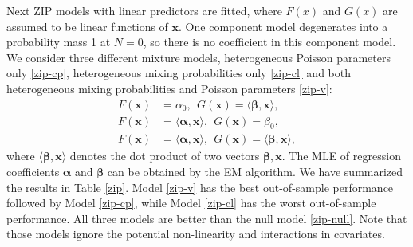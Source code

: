 \documentclass[11pt]{article}
\numberwithin{equation}{section}
\def\bx{\boldsymbol{x}}
\begin{document}
Next ZIP models with linear predictors are fitted, where $F(x)$ and $G(x)$ are assumed to be linear functions of $\bx$.
One component model degenerates into a probability mass 1 at $N=0$, so there is no coefficient in this component model. 
We consider three different mixture models, heterogeneous Poisson parameters only \eqref{zip-cp}, heterogeneous mixing probabilities only \eqref{zip-cl} and both heterogeneous  mixing probabilities and Poisson parameters \eqref{zip-v}:
\begin{align}
	F(\bx)&=\alpha_0, ~~G(\bx)=\langle \boldsymbol{\beta}, \bx\rangle, \label{zip-cp} \\
	F(\bx)&=\langle \boldsymbol{\alpha},\bx\rangle, ~~G(\bx)=\beta_0, \label{zip-cl} \\
	F(\bx)&=\langle \boldsymbol{\alpha},\bx \rangle, ~~G(\bx)=\langle \boldsymbol{\beta}, \bx \rangle, \label{zip-v}
\end{align}  
where $\langle \boldsymbol{\beta}, \bx \rangle$ denotes the dot product of two vectors $\boldsymbol{\beta}, \bx$. The MLE of regression coefficients $\boldsymbol{\alpha}$ and $\boldsymbol{\beta}$ can be obtained by the EM algorithm.
We have summarized the results in Table \ref{zip}.
Model \eqref{zip-v} has the best out-of-sample performance followed by Model \eqref{zip-cp}, while Model \eqref{zip-cl} has the worst out-of-sample performance.
All three models are better than the null model \eqref{zip-null}.
Note that those models ignore the potential non-linearity and interactions in covariates.
\end{document}
